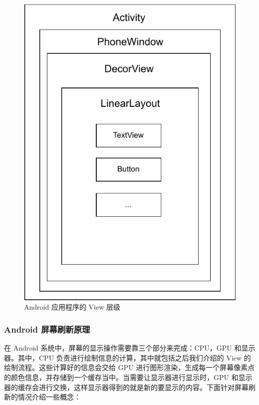 \begin{figure}
    \centering
    \includegraphics[scale=0.7]{assets/view-hierarchy.pdf}
    \caption{Android 应用程序的 View 层级}
\end{figure}

\subsubsection{Android 屏幕刷新原理}

在 Android 系统中，屏幕的显示操作需要靠三个部分来完成：CPU，GPU 和显示器。其中，CPU 负责进行绘制信息的计算，其中就包括之后我们介绍的 View 的绘制流程。这些计算好的信息会交给 GPU 进行图形渲染，生成每一个屏幕像素点的颜色信息，并存储到一个缓存当中。当需要让显示器进行显示时，GPU 和显示器的缓存会进行交换，这样显示器得到的就是新的要显示的内容。下面针对屏幕刷新的情况介绍一些概念：


